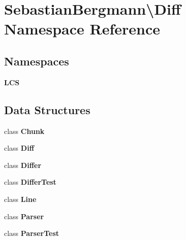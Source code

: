 \section{Sebastian\+Bergmann\textbackslash{}Diff Namespace Reference}
\label{namespace_sebastian_bergmann_1_1_diff}
\subsection*{Namespaces}
\begin{DoxyCompactItemize}
\item 
 {\bf L\+C\+S}
\end{DoxyCompactItemize}
\subsection*{Data Structures}
\begin{DoxyCompactItemize}
\item 
class {\bf Chunk}
\item 
class {\bf Diff}
\item 
class {\bf Differ}
\item 
class {\bf Differ\+Test}
\item 
class {\bf Line}
\item 
class {\bf Parser}
\item 
class {\bf Parser\+Test}
\end{DoxyCompactItemize}
